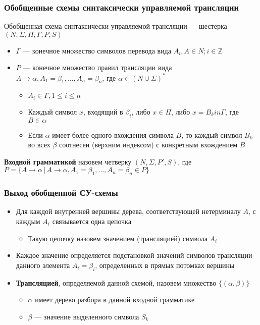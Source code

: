 \documentclass{beamer}
\begin{document}
\begin{frame}[fragile]
  \transwipe[direction=90]
  \frametitle{Обобщенные схемы синтаксически управляемой трансляции}
  Обобщенная схема синтаксически управляемой трансляции --- шестерка $(N, \Sigma, \Pi, \Gamma, P, S)$  
  \begin{itemize}
    \item $\Gamma$ --- конечное множество символов перевода вида $A_i, A \in N; i \in \mathbb{Z}$
    \item $P$ --- конечное множество правил трансляции вида $A \rightarrow 	\alpha, A_1 = \beta_1, \dots, A_n = \beta_n$, где $\alpha \in (N \cup \Sigma)^*$
    \begin{itemize}
      \item $A_i \in \Gamma, 1 \leq i \leq n$
      \item Каждый символ $x$, входящий в $\beta_i$, либо $x \in \Pi$, либо $x = B_k in \Gamma$, где $B \in \alpha$
      \item Если $\alpha$ имеет более одного вхождения символа $B$, то каждый символ $B_k$ во всех $\beta$ соотнесен (верхним индексом) с конкретным вхождением $B$
    \end{itemize}
  \end{itemize}
  
  \textbf{Входной грамматикой} назовем четверку $(N, \Sigma, P', S)$, где $P = \{ A \rightarrow \alpha \, | \, A \rightarrow \alpha, A_1 = \beta_1, \dots, A_n = \beta_n \in P  \}$
\end{frame}

\begin{frame}[fragile]
  \transwipe[direction=90]
  \frametitle{Выход обобщенной СУ-схемы}
  \begin{itemize}
    \item Для каждой внутренней вершины дерева, соответствующей нетерминалу $A$, с каждым $A_i$ связывается одна цепочка 
    \begin{itemize}
      \item Такую цепочку назовем значением (трансляцией) символа $A_i$
    \end{itemize}     
    \item Каждое значение определяется подстановкой значений символов трансляции данного элемента $A_i = \beta_i$, определенных в прямых потомках вершины
    \item \textbf{Трансляцией}, определяемой данной схемой, назовем множество $\{(\alpha, \beta)\}$
    \begin{itemize}
      \item $\alpha$ имеет дерево разбора в данной входной грамматике
      \item $\beta$ --- значение выделенного символа $S_k$
    \end{itemize}
  \end{itemize}

\end{frame}
\end{document}

